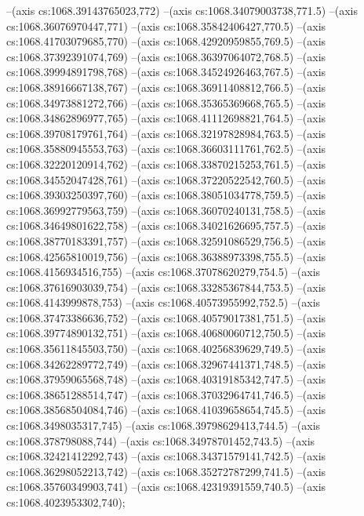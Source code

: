 --(axis cs:1068.39143765023,772)
--(axis cs:1068.34079003738,771.5)
--(axis cs:1068.36076970447,771)
--(axis cs:1068.35842406427,770.5)
--(axis cs:1068.41703079685,770)
--(axis cs:1068.42920959855,769.5)
--(axis cs:1068.37392391074,769)
--(axis cs:1068.36397064072,768.5)
--(axis cs:1068.39994891798,768)
--(axis cs:1068.34524926463,767.5)
--(axis cs:1068.38916667138,767)
--(axis cs:1068.36911408812,766.5)
--(axis cs:1068.34973881272,766)
--(axis cs:1068.35365369668,765.5)
--(axis cs:1068.34862896977,765)
--(axis cs:1068.41112698821,764.5)
--(axis cs:1068.39708179761,764)
--(axis cs:1068.32197828984,763.5)
--(axis cs:1068.35880945553,763)
--(axis cs:1068.36603111761,762.5)
--(axis cs:1068.32220120914,762)
--(axis cs:1068.33870215253,761.5)
--(axis cs:1068.34552047428,761)
--(axis cs:1068.37220522542,760.5)
--(axis cs:1068.39303250397,760)
--(axis cs:1068.38051034778,759.5)
--(axis cs:1068.36992779563,759)
--(axis cs:1068.36070240131,758.5)
--(axis cs:1068.34649801622,758)
--(axis cs:1068.34021626695,757.5)
--(axis cs:1068.38770183391,757)
--(axis cs:1068.32591086529,756.5)
--(axis cs:1068.42565810019,756)
--(axis cs:1068.36388973398,755.5)
--(axis cs:1068.4156934516,755)
--(axis cs:1068.37078620279,754.5)
--(axis cs:1068.37616903039,754)
--(axis cs:1068.33285367844,753.5)
--(axis cs:1068.4143999878,753)
--(axis cs:1068.40573955992,752.5)
--(axis cs:1068.37473386636,752)
--(axis cs:1068.40579017381,751.5)
--(axis cs:1068.39774890132,751)
--(axis cs:1068.40680060712,750.5)
--(axis cs:1068.35611845503,750)
--(axis cs:1068.40256839629,749.5)
--(axis cs:1068.34262289772,749)
--(axis cs:1068.32967441371,748.5)
--(axis cs:1068.37959065568,748)
--(axis cs:1068.40319185342,747.5)
--(axis cs:1068.38651288514,747)
--(axis cs:1068.37032964741,746.5)
--(axis cs:1068.38568504084,746)
--(axis cs:1068.41039658654,745.5)
--(axis cs:1068.3498035317,745)
--(axis cs:1068.39798629413,744.5)
--(axis cs:1068.378798088,744)
--(axis cs:1068.34978701452,743.5)
--(axis cs:1068.32421412292,743)
--(axis cs:1068.34371579141,742.5)
--(axis cs:1068.36298052213,742)
--(axis cs:1068.35272787299,741.5)
--(axis cs:1068.35760349903,741)
--(axis cs:1068.42319391559,740.5)
--(axis cs:1068.4023953302,740);

